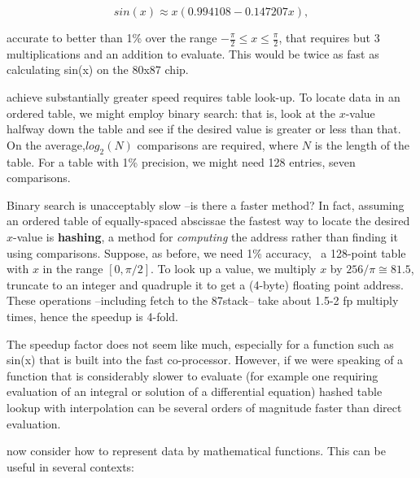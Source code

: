 \begin{equation}
sin(x) \approx x \left( 0.994108 - 0.147207x\right),
\end{equation}

accurate to better than 1\% over the range $-\frac{\pi}{2}\leq x \leq \frac{\pi}{2}$, that requires but 3 multiplications and an addition to evaluate. This would be twice as fast as calculating sin(x) on the 80x87 chip.

 achieve substantially greater speed requires table look-up. To locate data in an ordered table, we might employ binary search: that is, look at the $x$-value halfway down the table and see if the desired value is greater or less than that. On the average,$log_{2}(N)$ comparisons are required, where $N$ is the length of the table. For a table with 1\% precision, we might need 128 entries, \ie seven comparisons.

Binary search is unacceptably slow --is there a faster method? In fact, assuming an ordered table of equally-spaced abscissae the fastest way to locate the desired $x$-value is \textbf{hashing}, a method for \textit{computing} the address rather than finding it using comparisons. Suppose, as before, we need 1\% accuracy, \ie\ a 128-point table with $x$ in the range $[0,\pi/2]$. To look up a value, we multiply $x$ by $256/\pi \cong 81.5$, truncate to an integer and quadruple it to get a (4-byte) floating point address. These operations --including fetch to the 87stack-- take about 1.5-2 fp multiply times, hence the speedup is 4-fold.

The speedup factor does not seem like much, especially for a
function such as sin(x) that is built into the fast co-processor. However, if we were speaking of a function that is considerably slower to evaluate (for example one requiring evaluation of an integral or solution of a differential equation) hashed table lookup with interpolation can be several orders of magnitude faster than direct evaluation.

 now consider how to represent data by mathematical functions. This can be useful in several contexts:

